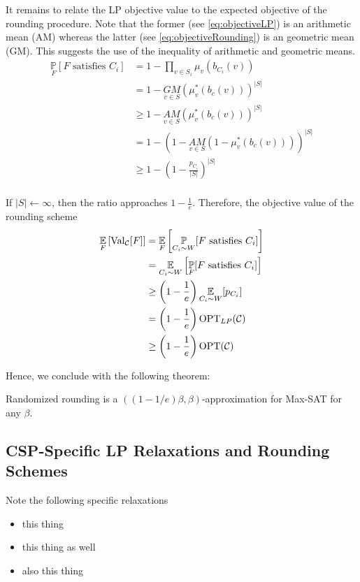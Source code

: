It remains to relate the LP objective value to the expected objective of the rounding procedure. 
Note that the former (see \eqref{eq:objectiveLP}) is an arithmetic mean (AM) whereas the latter (see \eqref{eq:objectiveRounding}) is an geometric mean (GM). 
This suggests the use of the inequality of arithmetic and geometric means.
\begin{align*}
		\underset{F}{\mathbb{P}}[ F \text{ satisfies } C_i] &= 1 - \prod_{v \in S_i} \mu_v(b_{C_i}(v))\\
		&= 1 - \underset{v \in S}{GM}(\mu_{v}^*(b_c(v)))^{|S|}\\
		&\ge 1 - \underset{v \in S}{AM}(\mu_{v}^*(b_c(v)))^{|S|}\\
		&= 1 - \left( 1  - \underset{v \in S}{AM}(1 -\mu_{v}^*(b_c(v))) \right)^{|S|}\\
		&\ge 1 - \left( 1  - \frac{p_{C_i}}{|S|}\right)^{|S|}\\
\end{align*}

If $|S| \leftarrow \infty$, then the ratio approaches $1 - \frac{1}{e}$. 
Therefore, the objective value of the rounding scheme
\begin{align*}
	\underset{F}{\mathbb{E}} \left[ \text{Val}_{\mathcal{C}}[F]\right] &= \underset{F}{\mathbb{E}}\left[ \underset{C_i \sim W}{\mathbb{P}}[ F \text{ satisfies } C_i] \right]\\
	&=  \underset{C_i \sim W}{\mathbb{E}}\left[ \underset{F}{\mathbb{P}}[ F \text{ satisfies } C_i] \right]\\
	&\ge \left( 1 - \frac{1}{e} \right) \underset{C_i \sim W}{\mathbb{E}} [ p_{C_i} ]\\
	&= \left( 1 - \frac{1}{e} \right) \text{OPT}_{LP}(\mathcal{C})\\
	&\ge \left( 1 - \frac{1}{e} \right) \text{OPT}(\mathcal{C})\\
\end{align*}

Hence, we conclude with the following theorem:
\begin{thm}
	Randomized rounding is a $\left( ( 1 - 1/e)\beta, \beta \right)$-approximation for Max-SAT for any $\beta$.
\end{thm}
\subsection{CSP-Specific LP Relaxations and Rounding Schemes}
Note the following specific relaxations
\begin{itemize}
\item this thing
\item this thing as well
\item also this thing
\end{itemize}

